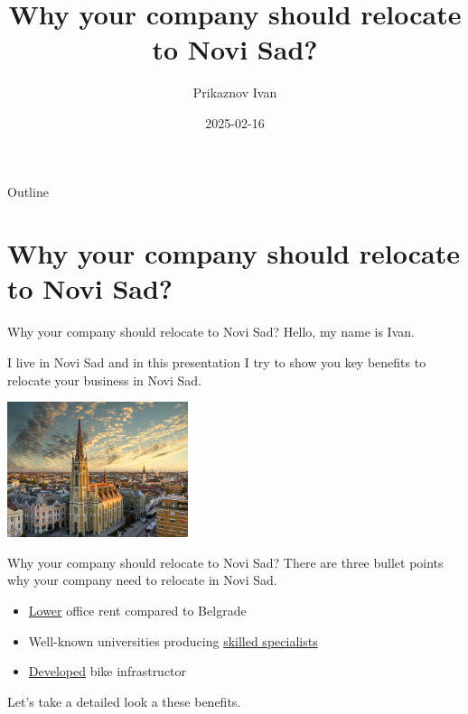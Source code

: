 \documentclass[presentation]{beamer}
\author{Prikaznov Ivan}
\date{2025-02-16}
\title{Why your company should relocate to Novi Sad?}
\begin{document}
\maketitle
\begin{frame}{Outline}
\tableofcontents
\end{frame}


\section{Why your company should relocate to Novi Sad?}
\label{sec:org377b05a}
\begin{frame}[label={sec:org4d9fb93}]{Why your company should relocate to Novi Sad?}
Hello, my name is Ivan.

I live in Novi Sad and in this presentation I try to show you key benefits to relocate your business in Novi Sad.

\begin{center}
\includegraphics[width=200px]{Novi Sad.jpg}
\end{center}
\end{frame}

\begin{frame}[label={sec:orgf3e3dce}]{Why your company should relocate to Novi Sad?}
There are three bullet points why your company need to relocate in Novi Sad.

\begin{itemize}
\item \uline{Lower} office rent compared to Belgrade
\item Well-known universities producing \uline{skilled specialists}
\item \uline{Developed} bike infrastructor
\end{itemize}

Let's take a detailed look a these benefits.
\end{frame}
\end{document}
